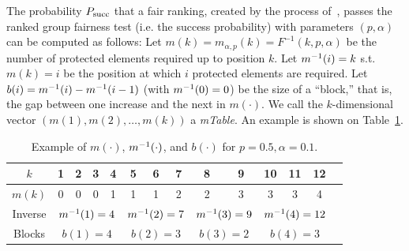 The probability $P_{\operatorname{succ}}$ that a fair ranking, created by the process of~\citet{yang2016measuring}, passes the ranked group fairness test (i.e. the success probability) with parameters $(p,\alpha)$ can be computed as follows:
%
Let $m(k) = m_{\alpha,p}(k) = F^{-1}(k,p,\alpha)$ be the number of protected elements required up to position $k$.
%
Let $m^{-1}(i) = k$ s.t. $m(k) = i$ be the position at which $i$ protected elements are required.
%
Let $b(i) = m^{-1}(i) - m^{-1}(i-1)$ (with $m^{-1}(0) = 0$) be the size of a ``block,'' that is, the gap between one increase and the next in $m(\cdot)$.
%
We call the $k$-dimensional vector $(m(1), m(2), \ldots , m(k))$ a \emph{mTable}.
%
An example is shown on Table~\ref{tbl:05:example_blocks}.
%
\begin{table}[b!]
	\centering
	\begin{tabular}{cccccccccccccc}\toprule
		$k$    & 1 & 2 & 3 & \textbf{{4}} & 5 & 6 & \textbf{7} & 8 & \textbf{9} & 10 & 11 & \textbf{12} \\
		\midrule
		$m(k)$ & 0 & 0 & 0 & \multicolumn{1}{c|}{1} & 1 & 1 & \multicolumn{1}{c|}{2} & 2 & \multicolumn{1}{c|}{3} & 3  & 3  & \multicolumn{1}{c}{4}\\
		Inverse   & \multicolumn{4}{c|}{$m^{-1}(1)=4$}
		& \multicolumn{3}{c|}{$m^{-1}(2)=7$}
		& \multicolumn{2}{c|}{$m^{-1}(3)=9$}
		& \multicolumn{3}{c}{$m^{-1}(4)=12$}\\
		Blocks       & \multicolumn{4}{c|}{$b(1)=4$}
		& \multicolumn{3}{c|}{$b(2)=3$}
		& \multicolumn{2}{c|}{$b(3)=2$}
		& \multicolumn{3}{c}{$b(4)=3$}\\
		\bottomrule
	\end{tabular}
	\caption[Example of different block sizes]{Example of $m(\cdot)$, $m^{-1}(\cdot)$, and $b(\cdot)$ for $p=0.5, \alpha=0.1$.}
	\label{tbl:05:example_blocks}
\end{table}

